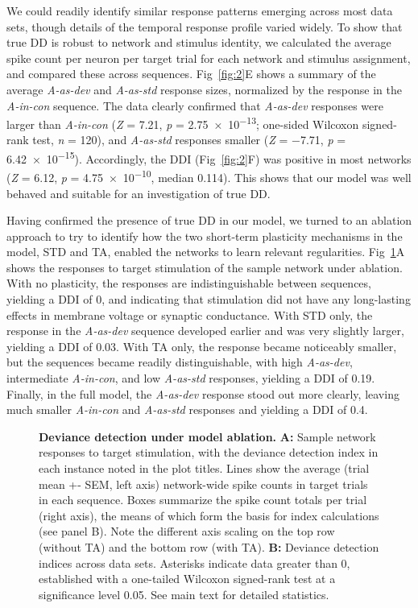 \documentclass[10pt,letterpaper]{article}
\newcommand{\dev}{\textit{A-as-dev}}
\newcommand{\msc}{\textit{A-in-con}}
\newcommand{\std}{\textit{A-as-std}}
\newcommand{\FIG}[1]{Fig~\ref{fig:#1}}
\newcommand{\statistic}[2]{\textit{#1} = \num{#2}}
\begin{document}
We could readily identify similar response patterns emerging across most data sets, though details of the temporal response profile varied widely. To show that true DD is robust to network and stimulus identity, we calculated the average spike count per neuron per target trial for each network and stimulus assignment, and compared these across sequences. \FIG{2}E shows a summary of the average \dev{} and \std{} response sizes, normalized by the response in the \msc{} sequence. The data clearly confirmed that \dev{} responses were larger than \msc{} (\statistic{Z}{7.21}, \statistic{p}{2.75e-13}; one-sided Wilcoxon signed-rank test, \statistic{n}{120}), and \std{} responses smaller (\statistic{Z}{-7.71}, \statistic{p}{6.42e-15}). Accordingly, the DDI (\FIG{2}F) was positive in most networks (\statistic{Z}{6.12}, \statistic{p}{4.75e-10}, median \num{0.114}). This shows that our model was well behaved and suitable for an investigation of true DD.

Having confirmed the presence of true DD in our model, we turned to an ablation approach to try to identify how the two short-term plasticity mechanisms in the model, STD and TA, enabled the networks to learn relevant regularities. \FIG{3}A shows the responses to target stimulation of the sample network under ablation. With no plasticity, the responses are indistinguishable between sequences, yielding a DDI of 0, and indicating that stimulation did not have any long-lasting effects in membrane voltage or synaptic conductance. With STD only, the response in the \dev{} sequence developed earlier and was very slightly larger, yielding a DDI of 0.03. With TA only, the response became noticeably smaller, but the sequences became readily distinguishable, with high \dev{}, intermediate \msc{}, and low \std{} responses, yielding a DDI of 0.19. Finally, in the full model, the \dev{} response stood out more clearly, leaving much smaller \msc{} and \std{} responses and yielding a DDI of 0.4.

\begin{figure}[!h]
    \caption{%
        \textbf{Deviance detection under model ablation.}
        \textbf{A:} Sample network responses to target stimulation, with the deviance detection index in each instance noted in the plot titles. Lines show the average (trial mean +- SEM, left axis) network-wide spike counts in target trials in each sequence. Boxes summarize the spike count totals per trial (right axis), the means of which form the basis for index calculations (see panel B). Note the different axis scaling on the top row (without TA) and the bottom row (with TA).
        \textbf{B:} Deviance detection indices across data sets. Asterisks indicate data greater than 0, established with a one-tailed Wilcoxon signed-rank test at a significance level 0.05. See main text for detailed statistics.
    }
    \label{fig:3}
\end{figure}
\end{document}
